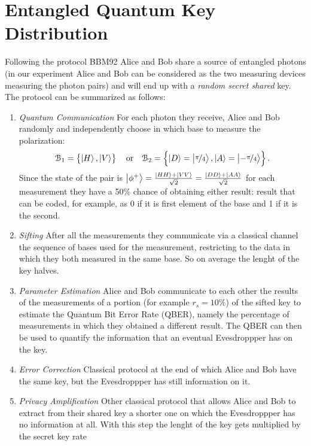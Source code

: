 \documentclass[a4paper, 11pt]{article}
\begin{document}
  \section{Entangled Quantum Key Distribution}
    Following the protocol BBM92 Alice and Bob share a source of entangled photons (in our experiment Alice and Bob can be considered as the two measuring devices measuring the photon pairs) and will end up with a \emph{random secret shared} key. The protocol can be summarized as follows:
    \begin{enumerate}
      \item \emph{Quantum Communication} For each photon they receive, Alice and Bob randomly and independently choose in which base to measure the polarization:
      \begin{gather*}
        \mathcal{B}_1 = \left\{ \ket{H}, \ket{V} \right\}
        \quad \text{or} \quad
        \mathcal{B}_2 = \left\{ \ket{D} = \ket{\frac[f]{\pi}{4}}, \ket{A} = \ket{-\frac[f]{\pi}{4}} \right\}.
      \end{gather*}
      Since the state of the pair is $\ket{\phi^+} = \frac{\ket{HH} + \ket{VV}}{\sqrt{2}} = \frac{\ket{DD} + \ket{AA}}{\sqrt{2}}$ for each measurement they have a 50\% chance of obtaining either result: result that can be coded, for example, as 0 if it is first element of the base and 1 if it is the second.
      \item \emph{Sifting} After all the measurements they communicate via a classical channel the sequence of bases used for the measurement, restricting to the data in which they both measured in the same base. So on average the lenght of the key halves.
      \item \emph{Parameter Estimation} Alice and Bob communicate to each other the results of the measurements of a portion (for example $r_s = 10\%$) of the sifted key to estimate the Quantum Bit Error Rate (QBER), namely the percentage of measurements in which they obtained a different result. The QBER can then be used to quantify the information that an eventual Evesdroppper has on the key.
      \item \emph{Error Correction} Classical protocol at the end of which Alice and Bob have the same key, but the Evesdroppper has still information on it.
      \item \emph{Privacy Amplification} Other classical protocol that allows Alice and Bob to extract from their shared key a shorter one on which the Evesdroppper has no information at all. With this step the lenght of the key gets multiplied by the secret key rate

\end{enumerate}
\end{document}
